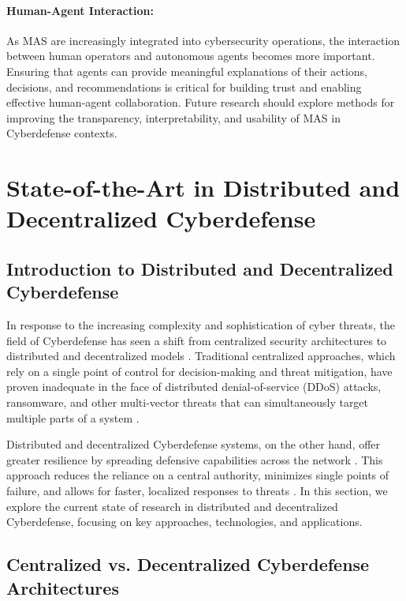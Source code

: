 \paragraph{Human-Agent Interaction:}
As MAS are increasingly integrated into cybersecurity operations, the interaction between human operators and autonomous agents becomes more important. Ensuring that agents can provide meaningful explanations of their actions, decisions, and recommendations is critical for building trust and enabling effective human-agent collaboration. Future research should explore methods for improving the transparency, interpretability, and usability of MAS in Cyberdefense contexts.



\section{State-of-the-Art in Distributed and Decentralized Cyberdefense}

\subsection{Introduction to Distributed and Decentralized Cyberdefense}

In response to the increasing complexity and sophistication of cyber threats, the field of Cyberdefense has seen a shift from centralized security architectures to distributed and decentralized models \cite{Chen2021, Misra2023}. Traditional centralized approaches, which rely on a single point of control for decision-making and threat mitigation, have proven inadequate in the face of distributed denial-of-service (DDoS) attacks, ransomware, and other multi-vector threats that can simultaneously target multiple parts of a system \cite{Munsing2018}.

Distributed and decentralized Cyberdefense systems, on the other hand, offer greater resilience by spreading defensive capabilities across the network \cite{Oliynykov2022}. This approach reduces the reliance on a central authority, minimizes single points of failure, and allows for faster, localized responses to threats \cite{Kott2021}. In this section, we explore the current state of research in distributed and decentralized Cyberdefense, focusing on key approaches, technologies, and applications.

\subsection{Centralized vs. Decentralized Cyberdefense Architectures}

